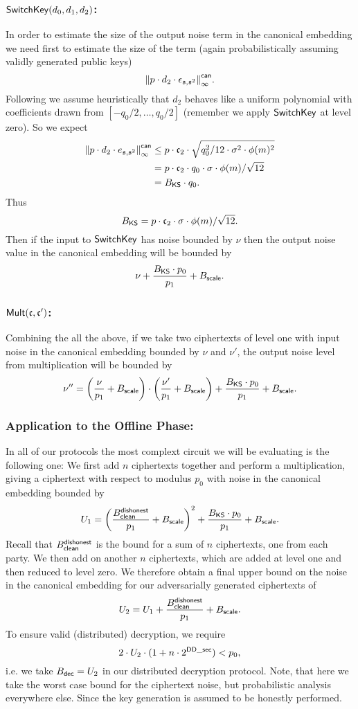 \subsubsection{$\mathsf{SwitchKey}(d_0,d_1,d_2)$:}
In order to estimate the size of the output noise term 
in the canonical embedding we need first to estimate the size of the term
(again probabilistically assuming validly generated public
keys)
\[ {\Vert p \cdot d_2 \cdot \epsilon_{\mathfrak{s},\mathfrak{s}^2} \Vert}_\infty^{\mathsf{can}}. \]
Following \cite{GHS12c} we assume heuristically that $d_2$
behaves like a uniform polynomial with coefficients drawn from
$[-q_0/2,\ldots,q_0/2]$ (remember we apply $\mathsf{SwitchKey}$ at level
zero).
So we expect
\begin{align*}
 {\Vert  p \cdot d_2 \cdot e_{\mathfrak{s},\mathfrak{s}^2} \Vert}_\infty^{\mathsf{can}} 
     &\le p \cdot \mathfrak{c}_2 \cdot \sqrt{q_0^2/12 \cdot \sigma^2 \cdot \phi(m)^2} \\
     & = p \cdot \mathfrak{c}_2 \cdot q_0 \cdot \sigma \cdot \phi(m)/\sqrt{12} \\
     & = B_{\mathsf{KS}} \cdot q_0.
\end{align*}
Thus
\[ B_{\mathsf{KS}} = p \cdot \mathfrak{c}_2 \cdot \sigma \cdot \phi(m)/\sqrt{12}. \]
Then if the input to $\mathsf{SwitchKey}$ has noise bounded by $\nu$ then the output 
noise value in the canonical embedding will be bounded by
\[ \nu+\frac{B_{\mathsf{KS}} \cdot p_0}{p_1} + B_{\mathsf{scale}}. \]


\subsubsection{$\mathsf{Mult}(\mathfrak{c},\mathfrak{c}')$:}
Combining the all the above, if we take two ciphertexts of level one
with input noise in the canonical embedding bounded by $\nu$ and $\nu'$, the output noise level 
from multiplication will be bounded by
\[ \nu'' =      \left( \frac{\nu}{p_1} + B_{\mathsf{scale}} \right)
	  \cdot 
                \left( \frac{\nu'}{p_1} + B_{\mathsf{scale}} \right)
		+ \frac{B_{\mathsf{KS}} \cdot p_0}{p_1}+B_{\mathsf{scale}}.
\]

\subsubsection{Application to the Offline Phase:}
In all of our protocols the most complext circuit we will be evaluating 
is the following one: 
We first add $n$ ciphertexts together and perform a multiplication, giving a 
ciphertext with respect to modulus $p_0$ with noise in the canonical
embedding bounded by
\[
  U_1 = \left( \frac{B_{\mathsf{clean}}^{\mathsf{dishonest}}}{p_1}+B_{\mathsf{scale}} \right)^2
		+ \frac{B_{\mathsf{KS}} \cdot p_0}{p_1} + B_{\mathsf{scale}}.
\]
Recall that $B_{\mathsf{clean}}^{\mathsf{dishonest}}$ is the bound for a sum of 
$n$ ciphertexts, one from each party.
We then add on another $n$ ciphertexts, which are added at 
level one and then reduced to level zero.
We therefore obtain a final upper bound on the noise 
in the canonical embedding for our adversarially generated ciphertexts of
\[ U_2 = U_1 +  \frac{B_{\mathsf{clean}}^{\mathsf{dishonest}}}{p_1} + B_{\mathsf{scale}}. \]
To ensure valid (distributed) decryption, we require
\[ 2 \cdot U_2 \cdot (1+n \cdot 2^{\mathsf{DD\_sec}}) < p_0, \]
i.e. we take $B_{\mathsf{dec}}=U_2$ in our distributed decryption protocol.
Note, that here we take the worst case bound for the ciphertext
noise, but probabilistic analysis everywhere else. Since 
the key generation is assumed to be honestly performed.


